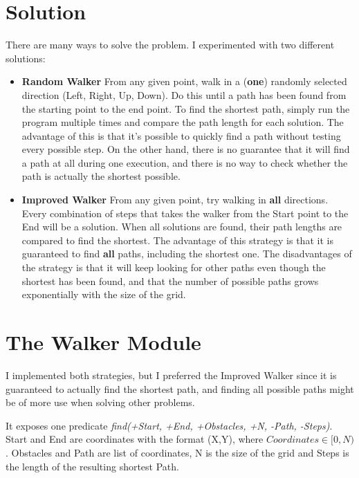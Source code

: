 \documentclass[a4paper]{article}
\begin{document}
\section{Solution}
There are many ways to solve the problem. I experimented with two different solutions:
\begin{itemize}
\item{\textbf{Random Walker}} From any given point, walk in a (\textbf{one}) randomly selected direction (Left, Right, Up, Down). Do this until a path has been found from the starting point to the end point. To find the shortest path, simply run the program multiple times and compare the path length for each solution. The advantage of this is that it's possible to quickly find a path without testing every possible step. On the other hand, there is no guarantee that it will find a path at all during one execution, and there is no way to check whether the path is actually the shortest possible.

\item{\textbf{Improved Walker}} From any given point, try walking in \textbf{all} directions. Every combination of steps that takes the walker from the Start point to the End will be a solution. When all solutions are found, their path lengths are compared to find the shortest. The advantage of this strategy is that it is guaranteed to find \textbf{all} paths, including the shortest one. The disadvantages of the strategy is that it will keep looking for other paths even though the shortest has been found, and that the number of possible paths grows exponentially with the size of the grid.
\end{itemize}

\section{The Walker Module}
I implemented both strategies, but I preferred the Improved Walker since it is guaranteed to actually find the shortest path, and finding all possible paths might be of more use when solving other problems.

It exposes one predicate \textit{find(+Start, +End, +Obstacles, +N, -Path, -Steps)}. Start and End are coordinates with the format (X,Y), where  ${Coordinates \in [0,N)}$. Obstacles and Path are list of coordinates, N is the size of the grid and Steps is the length of the resulting shortest Path.
\end{document}
